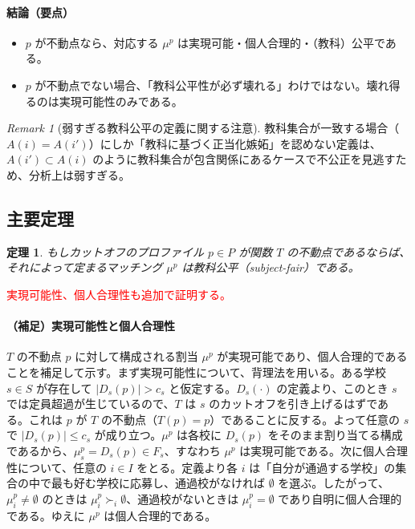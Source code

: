 \documentclass[12pt, a4paper]{article}
\theoremstyle{definition}
\theoremstyle{remark}
\newtheorem{remark}{Remark}
\theoremstyle{plain}
\newtheorem{theorem}{定理}
\begin{document}
\paragraph{結論（要点）}
\begin{itemize}
  \item $p$ が不動点なら、対応する $\mu^p$ は実現可能・個人合理的・（教科）公平である。
  \item $p$ が不動点でない場合、「教科公平性が必ず壊れる」わけではない。壊れ得るのは実現可能性のみである。
\end{itemize}

\begin{remark}[弱すぎる教科公平の定義に関する注意]
教科集合が一致する場合（$A(i)=A(i')$）にしか「教科に基づく正当化嫉妬」を認めない定義は、$A(i')\subset A(i)$ のように教科集合が包含関係にあるケースで不公正を見逃すため、分析上は弱すぎる。
\end{remark}



\subsection{主要定理}




\begin{theorem}
もしカットオフのプロファイル \( p \in P\) が関数 \( T \) の不動点であるならば、それによって定まるマッチング \( \mu^{p} \) は教科公平（subject-fair）である。
\end{theorem}

\textcolor{red}{実現可能性、個人合理性も追加で証明する。}

\paragraph{（補足）実現可能性と個人合理性} 
$T$ の不動点 $p$ に対して構成される割当 $\mu^p$ が実現可能であり、個人合理的であることを補足して示す。まず実現可能性について、背理法を用いる。ある学校 $s \in S$ が存在して $|D_s(p)|>c_s$ と仮定する。$D_s(\cdot)$ の定義より、このとき $s$ では定員超過が生じているので、$T$ は $s$ のカットオフを引き上げるはずである。これは $p$ が $T$ の不動点（$T(p)=p$）であることに反する。よって任意の $s$ で $|D_s(p)|\le c_s$ が成り立つ。$\mu^p$ は各校に $D_s(p)$ をそのまま割り当てる構成であるから、$\mu^p_s=D_s(p)\in F_s$、すなわち $\mu^p$ は実現可能である。次に個人合理性について、任意の $i\in I$ をとる。定義より各 $i$ は「自分が通過する学校」の集合の中で最も好む学校に応募し、通過校がなければ $\emptyset$ を選ぶ。したがって、$\mu^p_i\neq\emptyset$ のときは $\mu^p_i \succ_i \emptyset$、通過校がないときは $\mu^p_i=\emptyset$ であり自明に個人合理的である。ゆえに $\mu^p$ は個人合理的である。
\end{document}
